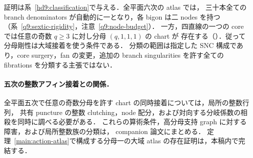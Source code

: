 証明は系~\ref{hd9:classification}で与える．全平面六次の atlas では，
三十本全ての branch denominators が自動的に一となり，各 bigon は二 nodes を持つ
（系~\ref{q9:sextic-rigidity}，注意~\ref{q9:node-budget}）．
一方，四直線の一つの core では任意の奇数 $q\ge3$ に対し分母 $(q,1,1,1)$ の chart が
存在する（\cite{QuinticArithmetic}）．従って分母剛性は大域接着を使う条件である．
分類の範囲は指定した SNC 構成であり，core surgery，fan の変更，追加の branch singularities
を許す全ての fibrations を分類する主張ではない．

\paragraph{五次の整数アフィン接着との関係．}
全平面五次で任意の奇数分母を許す chart の同時接着については，局所の整数行列，
共有 puncture の整数 clutching，node 配分，および対向する分岐係数の相殺を同時に調べる必要がある．
これらの算術条件，高分母支持 graph に対する障害，および局所整数族の分類は，
companion 論文\cite{QuinticArithmetic}にまとめる．
定理~\ref{main:action-atlas}で構成する分母一の大域 atlas の存在証明は，本稿内で完結する．
